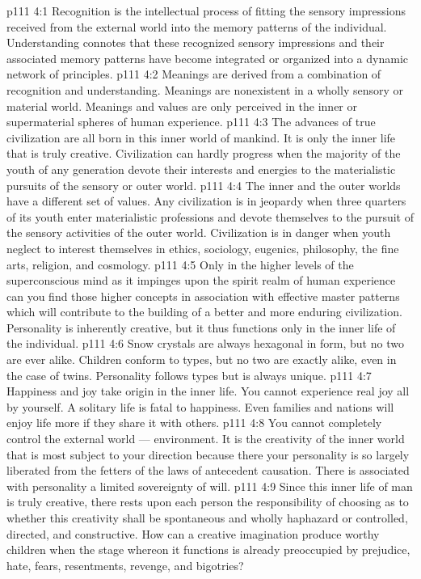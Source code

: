 \vs p111 4:1 Recognition is the intellectual process of fitting the sensory impressions received from the external world into the memory patterns of the individual. Understanding connotes that these recognized sensory impressions and their associated memory patterns have become integrated or organized into a dynamic network of principles.
\vs p111 4:2 Meanings are derived from a combination of recognition and understanding. Meanings are nonexistent in a wholly sensory or material world. Meanings and values are only perceived in the inner or supermaterial spheres of human experience.
\vs p111 4:3 \pc The advances of true civilization are all born in this inner world of mankind. It is only the inner life that is truly creative. Civilization can hardly progress when the majority of the youth of any generation devote their interests and energies to the materialistic pursuits of the sensory or outer world.
\vs p111 4:4 The inner and the outer worlds have a different set of values. Any civilization is in jeopardy when three quarters of its youth enter materialistic professions and devote themselves to the pursuit of the sensory activities of the outer world. Civilization is in danger when youth neglect to interest themselves in ethics, sociology, eugenics, philosophy, the fine arts, religion, and cosmology.
\vs p111 4:5 Only in the higher levels of the superconscious mind as it impinges upon the spirit realm of human experience can you find those higher concepts in association with effective master patterns which will contribute to the building of a better and more enduring civilization. Personality is inherently creative, but it thus functions only in the inner life of the individual.
\vs p111 4:6 \pc Snow crystals are always hexagonal in form, but no two are ever alike. Children conform to types, but no two are exactly alike, even in the case of twins. Personality follows types but is always unique.
\vs p111 4:7 \pc Happiness and joy take origin in the inner life. You cannot experience real joy all by yourself. A solitary life is fatal to happiness. Even families and nations will enjoy life more if they share it with others.
\vs p111 4:8 \pc You cannot completely control the external world --- environment. It is the creativity of the inner world that is most subject to your direction because there your personality is so largely liberated from the fetters of the laws of antecedent causation. There is associated with personality a limited sovereignty of will.
\vs p111 4:9 Since this inner life of man is truly creative, there rests upon each person the responsibility of choosing as to whether this creativity shall be spontaneous and wholly haphazard or controlled, directed, and constructive. How can a creative imagination produce worthy children when the stage whereon it functions is already preoccupied by prejudice, hate, fears, resentments, revenge, and bigotries?

